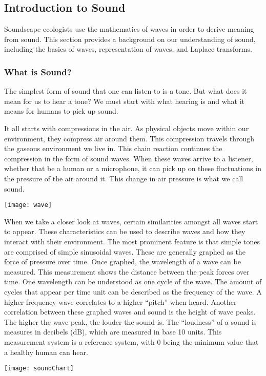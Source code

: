 \subsection{Introduction to Sound}
Soundscape ecologists use the mathematics of waves in order to derive meaning from sound. This section provides a background on our understanding of sound, including the basics of waves, representation of waves, and Laplace transforms.

\subsubsection{What is Sound?}
The simplest form of sound that one can listen to is a tone. But what does it mean for us to hear a tone? We must start with what hearing is and what it means for humans to pick up sound.\par
It all starts with compressions in the air. As physical objects move within our environment, they compress air around them. This compression travels through the gaseous environment we live in. This chain reaction continues the compression in the form of sound waves. When these waves arrive to a listener, whether that be a human or a microphone, it can pick up on these fluctuations in the pressure of the air around it. This change in air pressure is what we call sound.
\begin{center}
  \texttt{[image: wave]} \\[12pt]
\end{center}
\cite{villanueva}
When we take a closer look at waves, certain similarities amongst all waves start to appear. These characteristics can be used to describe waves and how they interact with their environment. The most prominent feature is that simple tones are comprised of simple sinusoidal waves. These are generally graphed as the force of pressure over time. Once graphed, the wavelength of a wave can be measured. This measurement shows the distance between the peak forces over time. One wavelength can be understood as one cycle of the wave. The amount of cycles that appear per time unit can be described as the frequency of the wave. A higher frequency wave correlates to a higher ``pitch'' when heard. Another correlation between these graphed waves and sound is the height of wave peaks. The higher the wave peak, the louder the sound is. The ``loudness'' of a sound is measures in decibels (dB), which are measured in base 10 units. This measurement system is a reference system, with 0 being the minimum value that a healthy human can hear.\cite{villanueva}
\begin{center}
  \texttt{[image: soundChart]} \\[12pt]
	\cite{sound}
\end{center}

